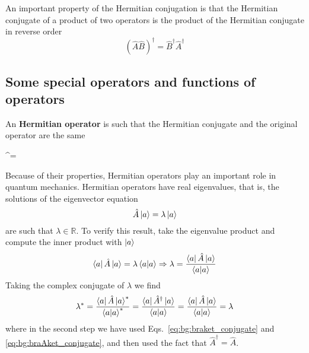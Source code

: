 \documentclass[../Main/chem532-notes.tex]{subfiles}
\begin{document}
An important property of the Hermitian conjugation is that the Hermitian conjugate of a product of two operators is the product of the Hermitian conjugate in reverse order
\begin{equation}
(\hat{A} \hat{B})^\dagger = \hat{B}^\dagger \hat{A}^\dagger
\end{equation}

\subsection{Some special operators and functions of operators}

An \textbf{Hermitian operator} is such that the Hermitian conjugate and the original operator are the same
\begin{iequation}
^\dagger = 
\end{iequation}
Because of their properties, Hermitian operators play an important role in quantum mechanics. Hermitian operators have real eigenvalues, that is, the solutions of the eigenvector equation
\begin{equation}
\hat{A} \ket{a} = \lambda \ket{a}
\end{equation}
are such that $\lambda \in \mathbb{R}$.
To verify this result, take the eigenvalue product and compute the inner product with $\ket{a}$
\begin{equation}
\bra{a} \hat{A} \ket{a} = \lambda \braket{a|a} \Rightarrow \lambda = \frac{\bra{a} \hat{A} \ket{a}}{\braket{a|a}}
\end{equation}
Taking the complex conjugate of $\lambda$ we find
\begin{equation}
\lambda^* = \frac{\bra{a} \hat{A} \ket{a}^*}{\braket{a|a}^*} = \frac{\bra{a} \hat{A}^\dagger \ket{a}}{\braket{a|a}} = 
\frac{\bra{a} \hat{A} \ket{a}}{\braket{a|a}} = \lambda
\end{equation}
where in the second step we have used Eqs.~\eqref{eq:bg:braket_conjugate} and \eqref{eq:bg:braAket_conjugate}, and then used the fact that $\hat{A}^\dagger = \hat{A}$.
\end{document}
